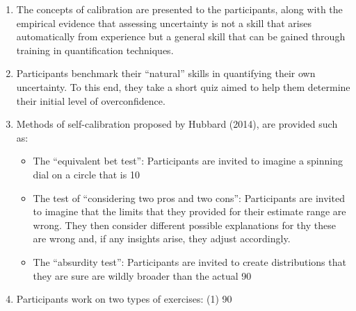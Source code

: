 \documentclass[
]{article}
\begin{document}
\begin{enumerate}
  \item The concepts of calibration are presented to the participants, along with the empirical evidence that assessing uncertainty is not a skill that arises automatically from experience but a general skill that can be gained through training in quantification techniques.
\item Participants benchmark their “natural” skills in quantifying their own uncertainty. To this end, they take a short quiz aimed to help them determine their initial level of overconfidence.
\item Methods of self-calibration proposed by Hubbard (2014), are provided such as: 
\begin{itemize}
  \item The “equivalent bet test”: Participants are invited to imagine a spinning dial on a circle that is 10%
  \item The test of “considering two pros and two cons”: Participants are invited to imagine that the limits that they provided for their estimate range are wrong. They then consider different possible explanations for thy these are wrong and, if any insights arise, they adjust accordingly.  
  \item The “absurdity test”: Participants are invited to create distributions that they are sure are wildly broader than the actual 90%
  \end{itemize}
\item Participants work on two types of exercises: (1) 90%
\end{enumerate}
\end{document}
